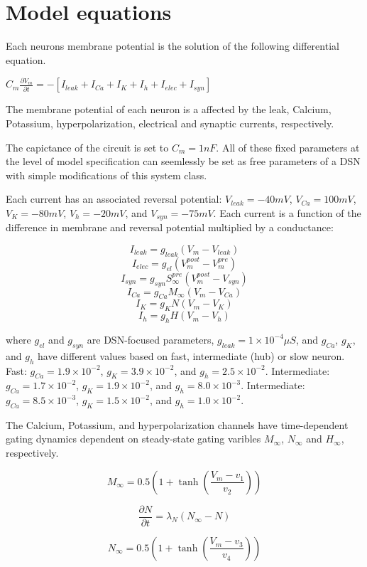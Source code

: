 \documentclass[11pt]{article}
\begin{document}
\section{Model equations}

Each neurons membrane potential is the solution of the following differential equation.

$ C_m \frac{\partial V_m}{\partial t} = - \left[ I_{leak} + I_{Ca} + I_K + I_h + I_{elec} + I_{syn}\right] $

The membrane potential of each neuron is a affected by the leak, Calcium, Potassium, hyperpolarization,
electrical and synaptic currents, respectively.

The capictance of the circuit is set to $C_m = 1nF$.  All of these fixed parameters at the level of
model specification can seemlessly be set as free parameters of a DSN with simple
modifications of this system class.

Each current has an associated reversal potential: $V_{leak} = -40mV$, $V_{Ca} = 100mV$,
$V_K = -80mV$, $V_h = -20mV$, and $V_{syn} = -75mV$. Each current is a function of the
difference in membrane and reversal potential multiplied by a conductance:

\[ I_{leak} = g_{leak} (V_m - V_{leak}) \]
\[ I_{elec} = g_{el} (V_m^{post} - V_m^{pre}) \]
\[ I_{syn} = g_{syn} S_\infty^{pre} (V_m^{post} - V_{syn}) \]
\[  I_{Ca} = g_{Ca} M_\infty (V_m - V_{Ca}) \]
\[ I_K = g_K N (V_m - V_K) \]
\[ I_h = g_h H(V_m - V_h) \]

where $g_{el}$ and $g_{syn}$ are DSN-focused parameters, $g_{leak} = 1 \times 10^{-4} \mu S$,
and $g_{Ca}$, $g_{K}$, and $g_{h}$ have different values based on fast, intermediate (hub)
or slow neuron.  Fast: $g_{Ca} = 1.9 \times 10^{-2}$, $ g_K = 3.9 \times 10^{-2} $,
and $ g_h = 2.5 \times 10^{-2} $.  Intermediate: $g_{Ca} = 1.7 \times 10^{-2}$,
$ g_K = 1.9 \times 10^{-2} $, and $ g_h = 8.0 \times 10^{-3} $.  Intermediate:
$g_{Ca} = 8.5 \times 10^{-3}$, $ g_K = 1.5 \times 10^{-2} $, and $ g_h = 1.0 \times 10^{-2} $.

The Calcium, Potassium, and hyperpolarization channels have time-dependent gating dynamics
dependent on steady-state gating varibles $M_\infty$, $N_\infty$ and $H_\infty$,
respectively.

\[ M_{\infty} = 0.5 \left( 1 + \tanh \left( \frac{V_m - v_1}{v_2} \right) \right) \]

\[ \frac{\partial N}{\partial t} = \lambda_N (N_\infty - N) \]

\[ N_\infty = 0.5 \left( 1 + \tanh \left( \frac{V_m - v_3}{v_4} \right) \right) \]
\end{document}

